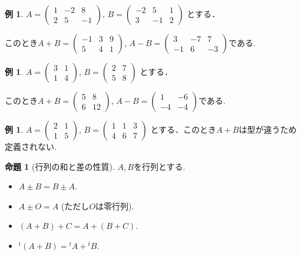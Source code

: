 \documentclass[dvipdfmx,a4paper,11pt]{article}
\theoremstyle{definition}
\newtheorem{prop}[thm]{命題}
\newtheorem{exa}[thm]{例}
\begin{document}
 \begin{exa}
 $A = 
 \begin{pmatrix}
 1 &-2&8 \\
 2&5&-1
 \end{pmatrix}
 $, 
 $
 B = 
 \begin{pmatrix}
 -2&5&1 \\
 3&-1&2
 \end{pmatrix}
 $
 とする．
 
 このとき$
 A+B =
 \begin{pmatrix}
 -1 &3&9 \\
 5&4&1
 \end{pmatrix}
 $, 
 $
  A-B =
 \begin{pmatrix}
 3 &-7&7 \\
 -1&6&-3
 \end{pmatrix}
 $である.
 \end{exa}

\begin{exa}
 $A = 
 \begin{pmatrix}
 3&1 \\
 1&4
 \end{pmatrix}
 $, 
 $
 B = 
 \begin{pmatrix}
 2&7\\
 5&8
 \end{pmatrix}
 $
 とする．
 
 このとき$
 A+B =
 \begin{pmatrix}
 5&8 \\
6&12
 \end{pmatrix}
 $, 
 $
  A-B =
 \begin{pmatrix}
 1&-6 \\
 -4&-4
 \end{pmatrix}
 $である.
 \end{exa}
 
 \begin{exa}
 $A = 
 \begin{pmatrix}
 2&1 \\
 1&5
 \end{pmatrix}
 $,
$ 
 B = 
 \begin{pmatrix}
 1&1 &3 \\
 4&6 & 7
 \end{pmatrix}
 $
 とする．このとき$A+B$は型が違うため定義されない. 
 \end{exa}
 
 \begin{tcolorbox}[
    colback = white,
    colframe = green!35!black,
    fonttitle = \bfseries,
    breakable = true]
    \begin{prop}[行列の和と差の性質]
$A, B$を行列とする.
 \begin{itemize}
 \item $A\pm B =B\pm A$.
  \item $A\pm O =A$ (ただし$O$は零行列).
  \item $(A+B)+C =A + (B+C)$.
  \item ${}^{t}(A+B) = {}^{t}A+ {}^{t}B$.
 \end{itemize}
  \end{prop}
 \end{tcolorbox}
 
\end{document}
